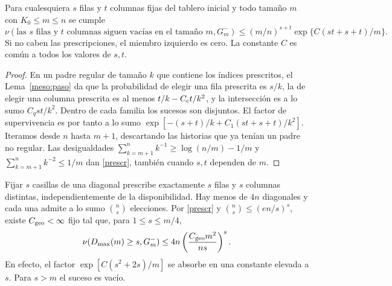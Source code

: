 \begin{lema}\label{meso:prescripciones}
Para cualesquiera $s$ filas y $t$ columnas fijas del tablero inicial y todo tamaño $m$ con
$K_0\le m\le n$ se cumple
\begin{equation}\label{prescr}
 \nu(\text{las $s$ filas y $t$ columnas siguen vacías en el tamaño $m$},G_m^-)
 \le (m/n)^{s+t}\exp\{C(st+s+t)/m\}.
\end{equation}
Si no caben las prescripciones, el miembro izquierdo es cero. La constante $C$ es común a todos los
valores de $s,t$.
\end{lema}
\begin{proof}
En un padre regular de tamaño $k$ que contiene los índices prescritos, el Lema~\ref{meso:paso} da que
la probabilidad de elegir una fila prescrita es $s/k$, la de elegir una columna prescrita es al menos
$t/k-C_{\rm c}t/k^2$, y la intersección es a lo sumo $C_qst/k^2$. Dentro de cada familia los sucesos
son disjuntos. El factor de supervivencia es por tanto a lo sumo
$\exp[-(s+t)/k+C_1(st+s+t)/k^2]$. Iteramos desde $n$ hasta $m+1$, descartando las historias que ya
tenían un padre no regular. Las desigualdades $\sum_{k=m+1}^n k^{-1}\ge\log(n/m)-1/m$ y
$\sum_{k=m+1}^n k^{-2}\le1/m$ dan \eqref{prescr}, también cuando $s,t$ dependen de $m$.
\end{proof}

Fijar $s$ casillas de una diagonal prescribe exactamente $s$ filas y $s$ columnas distintas,
independientemente de la disponibilidad. Hay menos de $4n$ diagonales y cada una admite a lo sumo
$\binom ns$ elecciones. Por \eqref{prescr} y $\binom ns\le(en/s)^s$,
existe $C_{\rm geo}<\infty$ fijo tal que, para $1\le s\le m/4$,
\begin{equation}\label{geompres}
 \nu(D_{\max}(m)\ge s,G_m^-)\le 4n\left(\frac{C_{\rm geo}m^2}{ns}\right)^s .
\end{equation}
En efecto, el factor $\exp[C(s^2+2s)/m]$ se absorbe en una constante elevada a $s$. Para $s>m$ el
suceso es vacío.
